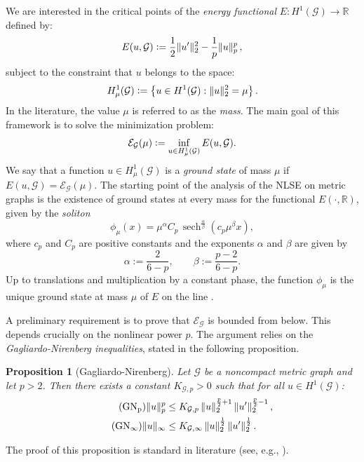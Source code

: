 \documentclass[12pt,a4paper]{amsart}
\theoremstyle{definition}
\theoremstyle{plain}
\newtheorem{proposition}[definition]{Proposition}
\def \G {\mathcal{G}}
\newcommand{\defeq}{\vcentcolon=}
\DeclareMathOperator{\sech}{sech}
\numberwithin{equation}{section}
\begin{document}
We are interested in the critical points of the \emph{energy functional} $E: H^1(\mathcal{G}) \to \mathbb{R}$ defined by:
\begin{equation}
E(u,\mathcal{G}) \defeq \frac{1}{2}\|u'\|_2^2 - \frac{1}{p}\|u\|_p^p\,,
\end{equation}
subject to the constraint that $u$ belongs to the space:
\[
H^1_{\mu}(\mathcal{G}) \defeq \left\{u\in H^1(\mathcal{G}): \|u\|_2^2=\mu\right\}.
\]
In the literature, the value $\mu$ is referred to as the \emph{mass}. The main goal of this framework is to solve the minimization problem:
\begin{equation}
    \mathcal{E}_{\mathcal{G}}(\mu) \defeq \inf_{u\in H^1_{\mu}(\mathcal{G})} E(u,\mathcal{G}).
\end{equation}
We say that a function $u\in H^1_{\mu}(\mathcal{G})$ is a \emph{ground state} of mass $\mu$ if $E(u,\mathcal{G})=\mathcal{E}_\mathcal{G}(\mu)$.
The starting point of the analysis of the NLSE on metric graphs is the existence of ground states at every mass for the functional $E(\cdot , \mathbb{R})$, given by the \emph{soliton}
\begin{equation}
    \phi_{\mu}(x) = \mu^{\alpha} C_p \, {\sech}^{\frac{\alpha}{\beta}}(c_p \mu^{\beta} x)
    \label{soliton} ,
\end{equation}
where $c_p$ and $C_p$ are positive constants and the exponents $\alpha$ and $\beta$ are given by
\begin{equation}
    \label{alfabeta}
    \alpha := \frac{2}{6-p}, \qquad
    \beta := \frac{p-2}{6-p}.
\end{equation}
Up to translations and multiplication by a constant phase,
the function $\phi_\mu$ is the unique
ground state at mass $\mu$ of $E$ on the line
\cite{Berestycki1983,Zakharov1972}. 

A preliminary requirement is to prove that $\mathcal{E}_{\mathcal{G}}$ is bounded from below. This depends crucially on the nonlinear power $p$. The argument relies on the \emph{Gagliardo-Nirenberg inequalities}, stated in the following proposition.
\begin{proposition}[Gagliardo-Nirenberg]
    Let $\G$ be a noncompact metric graph and let $p>2$. Then there exists a constant $K_{\G,p}>0$ such that for all $u \in H^1(\G)$:
        \begin{align}
        \tag{$\text{GN}_{\text{p}}$}
        \label{GNp}
            \|u\|^p_p &\le K_{\G,p} \, \|u\|_2^{\frac{p}{2}+1} \, \|u'\|_2^{\frac{p}{2}-1}\,,\\
        \tag{$\text{GN}_\infty$}
        \label{GNinfty}
            \|u\|_\infty &\le K_{\G,\infty} \, \|u\|_2^{\frac{1}{2}} \, \|u'\|_2^{\frac{1}{2}}\,.
        \end{align}
\end{proposition}
The proof of this proposition is standard in literature (see, e.g., \cite{Adami2012}). 
\end{document}
